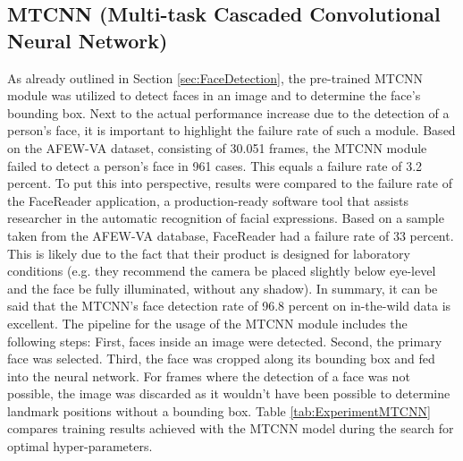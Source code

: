 \subsection{MTCNN (Multi-task Cascaded Convolutional Neural Network)}
As already outlined in Section \ref{sec:FaceDetection}, the pre-trained MTCNN module was utilized to detect faces in an image and to determine the face's bounding box. 
\newline\newline
Next to the actual performance increase due to the detection of a person's face, it is important to highlight the failure rate of such a module. Based on the AFEW-VA dataset, consisting of 30.051 frames, the MTCNN module failed to detect a person's face in 961 cases. This equals a failure rate of 3.2 percent. 
\newline\newline
To put this into perspective, results were compared to the failure rate of the FaceReader \citep{Noldus:2020:Facereader} application, a production-ready software tool that assists researcher in the automatic recognition of facial expressions. Based on a sample taken from the AFEW-VA database, FaceReader had a failure rate of 33 percent. This is likely due to the fact that their product is designed for laboratory conditions (e.g. they recommend the camera be placed slightly below eye-level and the face be fully illuminated, without any shadow). In summary, it can be said that the MTCNN's face detection rate of 96.8 percent on in-the-wild data is excellent.
\newline\newline
The pipeline for the usage of the MTCNN module includes the following steps: First, faces inside an image were detected. Second, the primary face was selected. Third, the face was cropped along its bounding box and fed into the neural network. For frames where the detection of a face was not possible, the image was discarded as it wouldn't have been possible to determine landmark positions without a bounding box. 
\newline\newline
Table \ref{tab:ExperimentMTCNN} compares training results achieved with the MTCNN model during the search for optimal hyper-parameters.

